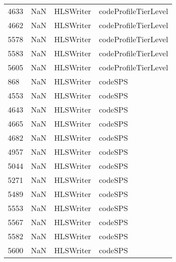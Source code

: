 \begin{tabular}{llll}
4633 &                   NaN &                  HLSWriter &                      codeProfileTierLevel \\
4662 &                   NaN &                  HLSWriter &                      codeProfileTierLevel \\
5578 &                   NaN &                  HLSWriter &                      codeProfileTierLevel \\
5583 &                   NaN &                  HLSWriter &                      codeProfileTierLevel \\
5605 &                   NaN &                  HLSWriter &                      codeProfileTierLevel \\
868  &                   NaN &                  HLSWriter &                                   codeSPS \\
4553 &                   NaN &                  HLSWriter &                                   codeSPS \\
4643 &                   NaN &                  HLSWriter &                                   codeSPS \\
4665 &                   NaN &                  HLSWriter &                                   codeSPS \\
4682 &                   NaN &                  HLSWriter &                                   codeSPS \\
4957 &                   NaN &                  HLSWriter &                                   codeSPS \\
5044 &                   NaN &                  HLSWriter &                                   codeSPS \\
5271 &                   NaN &                  HLSWriter &                                   codeSPS \\
5489 &                   NaN &                  HLSWriter &                                   codeSPS \\
5553 &                   NaN &                  HLSWriter &                                   codeSPS \\
5567 &                   NaN &                  HLSWriter &                                   codeSPS \\
5582 &                   NaN &                  HLSWriter &                                   codeSPS \\
5600 &                   NaN &                  HLSWriter &                                   codeSPS \\

\end{tabular}
